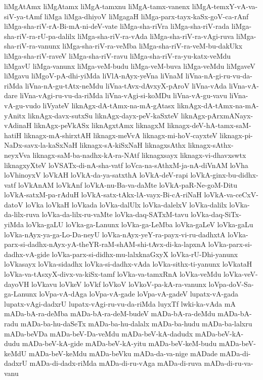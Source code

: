 {liMgAtAmx
liMgAtamx
liMgA-tamxnu
liMgA-tamx-vanenx
liMgA-temxY-vA-va-siV-ya-tAmf
liMga
liMga-dhiyoV
liMgagaH
liMga-parx-tayx-kaSx-goV-ca-rAnf
liMga-sha-riV-rA-Bi-mA-ni-deV-vate
liMga-sha-riVra
liMga-sha-riV-rada
liMga-sha-riV-ra-rU-pa-dalilx
liMga-sha-riV-ra-vAda
liMga-sha-riV-ra-vAgi-ruva
liMga-sha-riV-ra-vanunx
liMga-sha-riV-ra-veMba
liMga-sha-riV-ra-veM-bu-dakUkx
liMga-sha-riV-raveV
liMga-sha-riV-ravu
liMga-sha-riV-ra-yu-katx-veMdu
liMgavU
liMga-vanunx
liMga-veM-budu
liMga-veM-buva
liMga-veMdu
liMgaveV
liMgavu
liMgoV-pA-dhi-yiMda
liVlA-nAyx-yeVna
liVnaM
liVna-nA-gi-ru-vu-da-riMda
liVna-nA-gu-tAtx-neMdu
liVna-tAvx-dAvxyX-pAroV
liVna-vAda
liVna-vA-dare
liVna-vAgi-ru-vu-da-riMda
liVna-vAgi-si-koMDu
liVna-vA-gu-vavu
liVna-vA-gu-vudo
liVyateV
liknAgx-dA-tAmx-na-mA-gAtasx
liknAgx-dA-tAmx-na-mA-yAnitx
liknAgx-davx-sutxSu
liknAgx-dayx-peV-kaSxteV
liknAgx-pArxmANayx-vAdinaH
liknAgx-peVkASx
liknAgxtAmx
liknagxM
liknagx-deV-hA-tamx-saM-hatiH
liknagx-mA-shirxtAH
liknagx-meVvA
liknagx-mi-hoV-cayxteV
liknagx-pi-NaDx-savx-la-kaSxNaH
liknagx-sA-kiSxNaH
liknagxsAthx
liknagx-sAthx-neyxVva
liknagx-saM-ba-nadhx-kA-ra-NAtf
liknagxsayx
liknagx-vi-dhavxswtx
liknagxyXteV
loVSATx-di-nA-sha-vatf
loVca-na-sAthxM-ja-nA-diVnAM
loVha
loVhinoyxV
loVkAH
loVkA-da-ya-satxthA
loVkA-deV-rapi
loVkA-ginx-bu-didhx-vatf
loVkAnAM
loVkAnf
loVkA-nu-Ba-va-daMte
loVkA-paR-Ne-goM-Ditu
loVkA-satxM-pa-rAduH
loVkA-satx-tAkx-lA-vayx-Bi-cA-riNaH
loVkA-va-ceCxV-datoV
loVka
loVkaH
loVkada
loVka-dalUlx
loVka-dalelxV
loVka-dalilx
loVka-da-lilx-ruva
loVka-da-lilx-ru-vaMte
loVka-daq-SATxM-tavu
loVka-daq-SiTx-yiMda
loVka-gaLU
loVka-ga-Lanunx
loVka-ga-LeMba
loVka-gaLeV
loVka-gaLu
loVka-nAyx-ya-ga-Lo-Da-neyU
loVka-nAyx-yeY-ra-payx-vi-ru-dadhxtA
loVka-parx-si-dadhx-nAyx-yA-theYR-raM-shAM-shi-tAvx-di-ka-lapxnA
loVka-parx-si-dadhx-vA-gide
loVka-parx-si-didhx-mu-lalxknaGxyX
loVka-rU-Dhi-yanunx
loVkasayx
loVka-sidadhx
loVka-si-dadhx-vAda
loVka-sithx-ti-yanunx
loVkataH
loVka-va-tAsxyX-divx-va-kiSx-tamf
loVka-va-tamxRnA
loVka-veMdu
loVka-veV-dayoVH
loVkavu
loVkeV
loVkf
loVkoV
loVkoV-pa-kA-ra-vanunx
loVpa-doV-Sa-ga-Lanunx
loVpa-vA-dAga
loVpa-vA-gade
loVpa-vA-gadeV
lupatx-vA-gada
lupatx-vAgi-dadxrU
lupatx-vAgi-ru-vu-da-riMda
luyxTf
lwki-ka-vAda
mA
mADa-bA-ra-deMba
mADa-bA-ra-deM-budeV
mADa-bA-ra-deMdu
mADa-bA-radu
mADa-ba-hu-daSeTx
mADa-ba-hu-dalalx
mADa-ba-hudu
mADa-ba-lalxru
mADa-beVDa
mADa-beV-Da-veMdu
mADa-beV-kA-dadudx
mADa-beV-kA-dudu
mADa-beV-kA-gide
mADa-beV-kA-yitu
mADa-beV-keM-budu
mADa-beV-keMdU
mADa-beV-keMdu
mADa-beVku
mADa-da-va-nige
mADade
mADa-di-dadxrU
mADa-di-dadx-riMda
mADa-di-ru-vAga
mADa-di-ruva
mADa-di-ru-va-vanu
}
